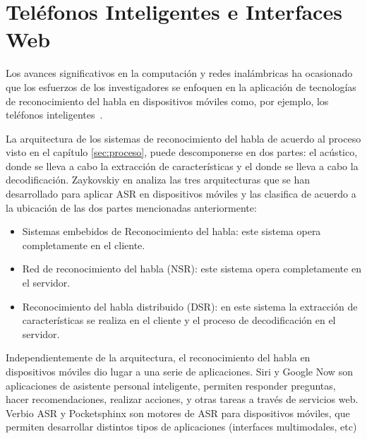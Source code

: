 \section{Tel\'efonos Inteligentes e Interfaces Web}
\label{sec:smartphones}

Los avances significativos en la computaci\'on y redes inal\'ambricas ha ocasionado
que los esfuerzos de los investigadores se enfoquen en la aplicaci\'on de tecnolog\'ias de
reconocimiento del habla en dispositivos m\'oviles como, por ejemplo, los tel\'efonos 
\mbox{inteligentes \cite{TanAutomatic2008}}.

La arquitectura de los sistemas de reconocimiento del habla de acuerdo al proceso visto en el cap\'itulo \ref{sec:proceso},
puede descomponerse en dos partes: el  ac\'ustico, donde se lleva a cabo
la extracci\'on de caracter\'isticas  y el  donde se lleva a cabo la decodificaci\'on. 
Zaykovskiy en \cite{ZaykovskiySurvey2006} analiza las tres arquitecturas que se han desarrollado
para aplicar ASR en dispositivos m\'oviles y las clasifica de acuerdo a la ubicaci\'on de las dos partes
mencionadas anteriormente:

\begin{itemize}
    \item Sistemas embebidos de Reconocimiento del habla: este sistema opera completamente en el cliente.
    \item Red de reconocimiento del habla (NSR): este sistema opera completamente en el servidor. 
    \item Reconocimiento del habla distribuido (DSR): en este sistema la extracci\'on de caracter\'isticas se realiza
        en el cliente y el proceso de decodificaci\'on en el servidor.
\end{itemize}

Independientemente de la arquitectura, el reconocimiento del habla en dispositivos m\'oviles dio lugar a una 
serie de aplicaciones. Siri \cite{AppleSiri, OneAccordSiri} y Google Now \cite{GoogleNow} 
son aplicaciones de asistente personal inteligente, permiten responder preguntas,
hacer recomendaciones, realizar acciones, y otras tareas a trav\'es de servicios web. Verbio ASR \cite{VerbioASR} y 
Pocketsphinx \cite{HugginsDainesPocketSphinx2006, PocketSphinxHomePage} son motores de ASR para dispositivos
m\'oviles, que permiten desarrollar distintos tipos de aplicaciones (interfaces multimodales, etc)

